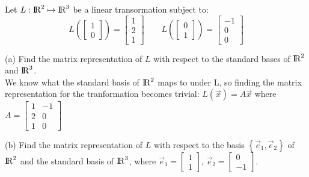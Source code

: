 \documentclass{article}
\begin{document}
\begin{problem}
    Let $L: {\rm I\!R}^2 \mapsto {\rm I\!R}^3$ be a linear transormation subject to:
    $$
    L(\begin{bmatrix} 1\\ 0 \end{bmatrix}) = 
        \begin{bmatrix} 1\\ 2\\ 1 \end{bmatrix}
    \quad\quad
    L(\begin{bmatrix} 0\\ 1 \end{bmatrix}) = 
        \begin{bmatrix} -1\\ 0\\ 0 \end{bmatrix}
    $$
    
    \begin{description}

    \item{(a)} Find the matrix representation of $L$ with respect to the standard bases
                    of ${\rm I\!R}^2$ and ${\rm I\!R}^3$.\\

        We know what the standard basis of ${\rm I\!R}^2$ maps to under L, so finding the 
        matrix representation for the tranformation becomes trivial: $L(\vec{x}) = A\vec{x}$
        where $A=
        \begin{bmatrix} 1 & -1 \\ 2 & 0 \\ 1 & 0 \end{bmatrix}$
    
    \item{(b)} Find the matrix representation of $L$ with respect to the basis 
                $\left \{ \vec{e}_1, \vec{e}_2 \right \}$ of ${\rm I\!R}^2$ and the standard basis
                of ${\rm I\!R}^3$, where $\vec{e}_1 = \begin{bmatrix}1\\ 1 \end{bmatrix}$, 
                $\vec{e}_2 = \begin{bmatrix}0\\ -1 \end{bmatrix}$.\\


\end{description}
\end{problem}
\end{document}

